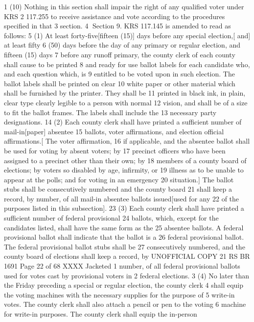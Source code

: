 1 (10) Nothing in this section shall impair the right of any qualified voter under KRS
2 117.255 to receive assistance and vote according to the procedures specified in that
3 section.
4 Section 9. KRS 117.145 is amended to read as follows:
5 (1) At least forty-five[fifteen (15)] days before any special election,[ and] at least fifty
6 (50) days before the day of any primary or regular election, and fifteen (15) days
7 before any runoff primary, the county clerk of each county shall cause to be printed
8 and ready for use ballot labels for each candidate who, and each question which, is
9 entitled to be voted upon in such election. The ballot labels shall be printed on clear
10 white paper or other material which shall be furnished by the printer. They shall be
11 printed in black ink, in plain, clear type clearly legible to a person with normal
12 vision, and shall be of a size to fit the ballot frames. The labels shall include the
13 necessary party designations.
14 (2) Each county clerk shall have printed a sufficient number of mail-in[paper] absentee
15 ballots, voter affirmations, and election official affirmations.[ The voter affirmation,
16 if applicable, and the absentee ballot shall be used for voting by absent voters; by
17 precinct officers who have been assigned to a precinct other than their own; by
18 members of a county board of elections; by voters so disabled by age, infirmity, or
19 illness as to be unable to appear at the polls; and for voting in an emergency
20 situation.] The ballot stubs shall be consecutively numbered and the county board
21 shall keep a record, by number, of all mail-in absentee ballots issued[used for any
22 of the purposes listed in this subsection].
23 (3) Each county clerk shall have printed a sufficient number of federal provisional
24 ballots, which, except for the candidates listed, shall have the same form as the
25 absentee ballots. A federal provisional ballot shall indicate that the ballot is a
26 federal provisional ballot. The federal provisional ballot stubs shall be
27 consecutively numbered, and the county board of elections shall keep a record, by 
UNOFFICIAL COPY 21 RS BR 1691
Page 22 of 68
XXXX Jacketed
1 number, of all federal provisional ballots used for votes cast by provisional voters in
2 federal elections.
3 (4) No later than the Friday preceding a special or regular election, the county clerk
4 shall equip the voting machines with the necessary supplies for the purpose of
5 write-in votes. The county clerk shall also attach a pencil or pen to the voting
6 machine for write-in purposes. The county clerk shall equip the in-person
